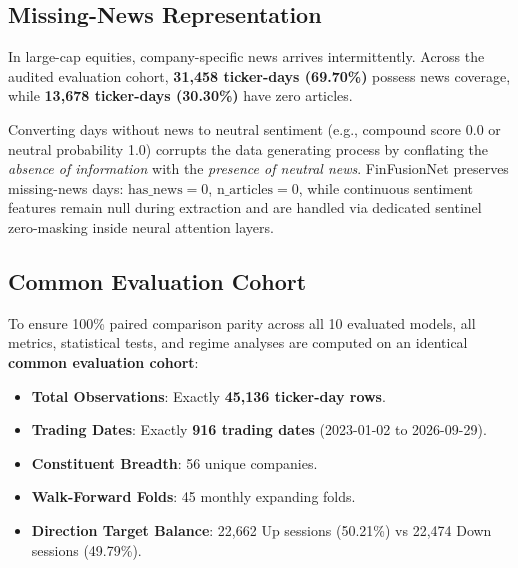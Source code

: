 \documentclass[10pt,journal,compsoc,twocolumn]{IEEEtran}
\begin{document}
\subsection{Missing-News Representation}
In large-cap equities, company-specific news arrives intermittently. Across the audited evaluation cohort, \textbf{31,458 ticker-days (69.70\%)} possess news coverage, while \textbf{13,678 ticker-days (30.30\%)} have zero articles. 

Converting days without news to neutral sentiment (e.g., compound score 0.0 or neutral probability 1.0) corrupts the data generating process by conflating the \textit{absence of information} with the \textit{presence of neutral news}. FinFusionNet preserves missing-news days: $\text{has\_news} = 0$, $\text{n\_articles} = 0$, while continuous sentiment features remain null during extraction and are handled via dedicated sentinel zero-masking inside neural attention layers.

\subsection{Common Evaluation Cohort}
To ensure 100\% paired comparison parity across all 10 evaluated models, all metrics, statistical tests, and regime analyses are computed on an identical \textbf{common evaluation cohort}:
\begin{itemize}
    \item \textbf{Total Observations}: Exactly \textbf{45,136 ticker-day rows}.
    \item \textbf{Trading Dates}: Exactly \textbf{916 trading dates} (2023-01-02 to 2026-09-29).
    \item \textbf{Constituent Breadth}: 56 unique companies.
    \item \textbf{Walk-Forward Folds}: 45 monthly expanding folds.
    \item \textbf{Direction Target Balance}: 22,662 Up sessions (50.21\%) vs 22,474 Down sessions (49.79\%).
\end{itemize}
\end{document}
